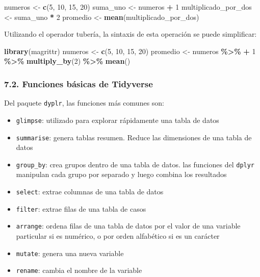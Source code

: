 \documentclass[
]{article}
\newenvironment{Shaded}{\begin{snugshade}}{\end{snugshade}}
\newcommand{\DecValTok}[1]{\textcolor[rgb]{0.00,0.00,0.81}{#1}}
\newcommand{\FunctionTok}[1]{\textcolor[rgb]{0.13,0.29,0.53}{\textbf{#1}}}
\newcommand{\NormalTok}[1]{#1}
\newcommand{\OtherTok}[1]{\textcolor[rgb]{0.56,0.35,0.01}{#1}}
\newcommand{\SpecialCharTok}[1]{\textcolor[rgb]{0.81,0.36,0.00}{\textbf{#1}}}
\providecommand{\tightlist}{%
  \setlength{\itemsep}{0pt}\setlength{\parskip}{0pt}}
\begin{document}
\begin{Shaded}
\begin{Highlighting}[]
\NormalTok{numeros }\OtherTok{\textless{}{-}} \FunctionTok{c}\NormalTok{(}\DecValTok{5}\NormalTok{, }\DecValTok{10}\NormalTok{, }\DecValTok{15}\NormalTok{, }\DecValTok{20}\NormalTok{)}
\NormalTok{suma\_uno }\OtherTok{\textless{}{-}}\NormalTok{ numeros }\SpecialCharTok{+} \DecValTok{1}
\NormalTok{multiplicado\_por\_dos }\OtherTok{\textless{}{-}}\NormalTok{ suma\_uno }\SpecialCharTok{*} \DecValTok{2}
\NormalTok{promedio }\OtherTok{\textless{}{-}} \FunctionTok{mean}\NormalTok{(multiplicado\_por\_dos)}
\end{Highlighting}
\end{Shaded}

Utilizando el operador tubería, la sintaxis de esta operación se puede
simplificar:

\begin{Shaded}
\begin{Highlighting}[]
\FunctionTok{library}\NormalTok{(magrittr)}
\NormalTok{numeros }\OtherTok{\textless{}{-}} \FunctionTok{c}\NormalTok{(}\DecValTok{5}\NormalTok{, }\DecValTok{10}\NormalTok{, }\DecValTok{15}\NormalTok{, }\DecValTok{20}\NormalTok{)}
\NormalTok{promedio }\OtherTok{\textless{}{-}}\NormalTok{ numeros }\SpecialCharTok{\%\textgreater{}\%}  \SpecialCharTok{+} \DecValTok{1} \SpecialCharTok{\%\textgreater{}\%} \FunctionTok{multiply\_by}\NormalTok{(}\DecValTok{2}\NormalTok{) }\SpecialCharTok{\%\textgreater{}\%}  \FunctionTok{mean}\NormalTok{()}
\end{Highlighting}
\end{Shaded}

\subsubsection{7.2. Funciones básicas de
Tidyverse}\label{funciones-buxe1sicas-de-tidyverse}

Del paquete \texttt{dyplr}, las funciones más comunes son:

\begin{itemize}
\tightlist
\item
  \texttt{glimpse}: utilizado para explorar rápidamente una tabla de
  datos
\item
  \texttt{summarise}: genera tablas resumen. Reduce las dimensiones de
  una tabla de datos
\item
  \texttt{group\_by}: crea grupos dentro de una tabla de datos. las
  funciones del \texttt{dplyr} manipulan cada grupo por separado y luego
  combina los resultados
\item
  \texttt{select}: extrae columnas de una tabla de datos
\item
  \texttt{filter}: extrae filas de una tabla de casos
\item
  \texttt{arrange}: ordena filas de una tabla de datos por el valor de
  una variable particular si es numérico, o por orden alfabético si es
  un carácter
\item
  \texttt{mutate}: genera una nueva variable
\item
  \texttt{rename}: cambia el nombre de la variable
\end{itemize}
\end{document}
